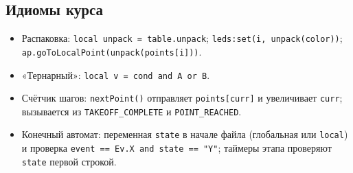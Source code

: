 \subsection{Идиомы курса}
\begin{itemize}
\item Распаковка: \verb|local unpack = table.unpack|; \verb|leds:set(i, unpack(color))|; \verb|ap.goToLocalPoint(unpack(points[i]))|.
\item «Тернарный»: \verb|local v = cond and A or B|.
\item Счётчик шагов: \verb|nextPoint()| отправляет \verb|points[curr]| и увеличивает \verb|curr|; вызывается из \verb|TAKEOFF_COMPLETE| и \verb|POINT_REACHED|.
\item Конечный автомат: переменная \verb|state| в начале файла (глобальная или \verb|local|) и проверка \verb|event == Ev.X and state == "Y"|; таймеры этапа проверяют \verb|state| первой строкой.
\end{itemize}
